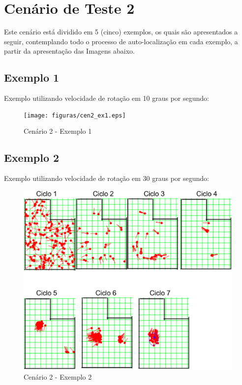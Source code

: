 \section{Cenário de Teste 2}

Este cenário está dividido em 5 (cinco) exemplos, os quais são apresentados a seguir, contemplando todo o processo de auto-localização
em cada exemplo, a partir da apresentação das Imagens abaixo.

\subsection{Exemplo 1}

Exemplo utilizando velocidade de rotação em 10 graus por segundo:

\begin{figure}[H]
  \centering
  \texttt{[image: figuras/cen2\_ex1.eps]}
  \caption[Cenário 2 - Exemplo 1]{Cenário 2 - Exemplo 1}
  \label{img:cen2_ex1}
\end{figure}

\subsection{Exemplo 2}

Exemplo utilizando velocidade de rotação em 30 graus por segundo:

\begin{figure}[H]
  \centering
  \includegraphics[scale=0.4]{figuras/cen2_ex2.eps}
  \caption[Cenário 2 - Exemplo 2]{Cenário 2 - Exemplo 2}
  \label{img:cen2_ex2}
\end{figure}

